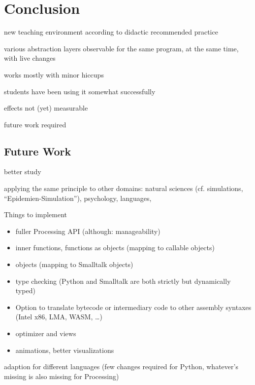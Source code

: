 
\chapter{Conclusion} \label{ch_conclusion}

\begin{todo}
\item new teaching environment according to didactic recommended practice
\item various abstraction layers observable for the same program, at the same time, with live changes
\item works mostly with minor hiccups
\item students have been using it somewhat successfully
\item effects not (yet) measurable
\item future work required
\end{todo}


\section{Future Work} \label{sc_future}

\begin{todo}
\item better study
\item applying the same principle to other domains: natural sciences (cf. simulations, \eg ``Epidemien-Simulation''), psychology, languages, \etc
\item Things to implement
\begin{itemize}
\item fuller Processing API (although: manageability)
\item inner functions, functions as objects (mapping to callable objects)
\item objects (mapping to Smalltalk objects)
\item type checking (Python and Smalltalk are both strictly but dynamically typed)
\item Option to translate bytecode or intermediary code to other assembly syntaxes (Intel x86, LMA, WASM, \dots)
\item optimizer and views
\item animations, better visualizations
\end{itemize}
\item adaption for different languages (few changes required for Python, whatever's missing is also missing for Processing)
\end{todo}
